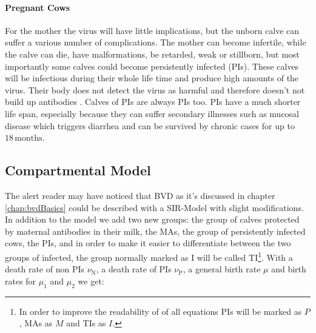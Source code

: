 \paragraph{Pregnant Cows}
For the mother the virus will have little implications, but the unborn calve can suffer a various number of complications. The mother can become infertile, while the calve can die, have malformations, be retarded, weak or stillborn, but most importantly some calves could become persistently infected (PIs). These calves will be infectious during their whole life time and produce high amounts of the virus. Their body does not detect the virus as harmful and therefore doesn't not build up antibodies \citep{personalCom}. Calves of PIs are always PIs too. PIs have a much shorter life span, especially because they can suffer secondary illnesses such as mucosal disease which triggers diarrhea and can be survived by chronic cases for up to $18\,\text{months}$.

\subsection{Compartmental Model}
The alert reader may have noticed that BVD as it's discussed in chapter \ref{chap:bvdBasics} could be described with a SIR-Model with slight modifications. In addition to the model we add two new groups: the group of calves protected by maternal antibodies in their milk, the MAs, the group of persistently infected cows, the PIs, and in order to make it easier to differentiate between the two groups of infected, the group normally marked as I will be called TI\footnote{In order to improve the readability of of all equations PIs will be marked as $P$, MAs as $M$ and TIs as $I$.}.
 With a death rate of non PIs $\nu_\text{N}$, a death rate of PIs $\nu_\text{P}$, a general birth rate $\mu$ and birth rates for $\mu_1$ and $\mu_2$ we get:

